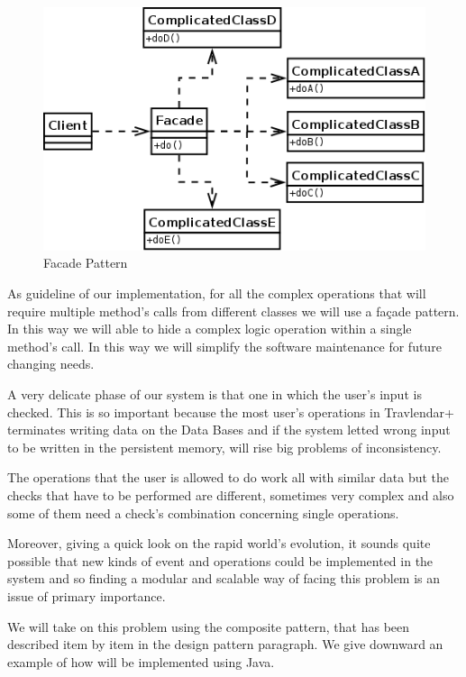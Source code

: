 \begin{figure}[H]
	\centering
	\includegraphics[scale=0.3]{Images/Patterns/Facade_Pattern}
	\caption{Facade Pattern}
\end{figure}
As guideline of our implementation, for all the complex operations that will require multiple method’s calls from different classes we will use a façade pattern. In this way we will able to hide a complex logic operation within a single method’s call. In this way we will simplify the software maintenance for future changing needs.



A very delicate phase of our system is that one in which the user's input is checked. This is so important because the most user’s operations in Travlendar+ terminates writing data on the Data Bases and if the system letted wrong input to be written in the persistent memory, will rise big problems of inconsistency.

The operations that the user is allowed to do work all with similar data but the checks that have to be performed are different, sometimes very complex and also some of them need a check’s combination concerning single operations.

Moreover, giving a quick look on the rapid world’s evolution, it sounds quite possible that new kinds of event and operations could be implemented in the system and so finding a modular and scalable way of facing this problem is an issue of primary importance.

We will take on this problem using the composite pattern, that has been described item by item in the design pattern paragraph. We give downward an example of how will be implemented using Java.

